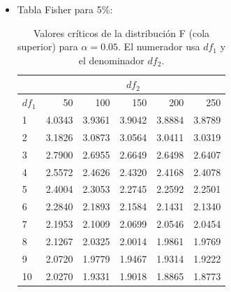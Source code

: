 \documentclass[10pt,a4paper]{article}
\begin{document}
\begin{enumerate}
\begin{itemize}
\item Tabla Fisher para 5\%:
\begin{table}[H]
\centering
\caption{Valores críticos de la distribución F (cola superior) para $\alpha=0.05$. 
El numerador usa $df_1$ y el denominador $df_2$.}
\label{tab:Fcrit_5pct}
\begin{tabular}{|l|r|r|r|r|r|}
\hline
& \multicolumn{5}{c|}{$df_2$} \\
\hline
$df_1$ & 50 & 100 & 150 & 200 & 250 \\
\hline
1  & 4.0343 & 3.9361 & 3.9042 & 3.8884 & 3.8789 \\
\hline
2  & 3.1826 & 3.0873 & 3.0564 & 3.0411 & 3.0319 \\
\hline
3  & 2.7900 & 2.6955 & 2.6649 & 2.6498 & 2.6407 \\
\hline
4  & 2.5572 & 2.4626 & 2.4320 & 2.4168 & 2.4078 \\
\hline
5  & 2.4004 & 2.3053 & 2.2745 & 2.2592 & 2.2501 \\
\hline
6  & 2.2840 & 2.1893 & 2.1584 & 2.1431 & 2.1340 \\
\hline
7  & 2.1953 & 2.1009 & 2.0699 & 2.0546 & 2.0454 \\
\hline
8  & 2.1267 & 2.0325 & 2.0014 & 1.9861 & 1.9769 \\
\hline
9  & 2.0720 & 1.9779 & 1.9467 & 1.9314 & 1.9222 \\
\hline
10 & 2.0270 & 1.9331 & 1.9018 & 1.8865 & 1.8773 \\
\hline
\end{tabular}
\end{table}


\end{itemize}

 \end{enumerate}
\end{document}
